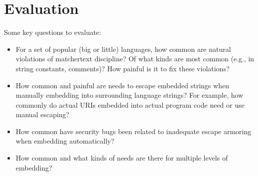 \section{Evaluation}
\label{sec:eval}

Some key questions to evaluate:
\begin{itemize}
\item	For a set of popular (big or little) languages,
	how common are natural violations of matchertext discipline?
	Of what kinds are most common (e.g., in string constants, comments)?
	How painful is it to fix these violations?
\item	How common and painful are needs to escape embedded strings
	when manually embedding into surrounding language strings?
	For example, how commonly do actual URIs embedded into
	actual program code need or use manual escaping?
\item	How common have security bugs been related to
	inadequate escape armoring when embedding automatically?
\item	How common and what kinds of needs are there for
	multiple levels of embedding?
\end{itemize}

